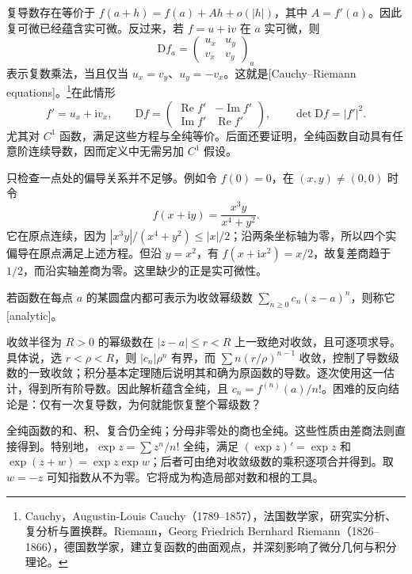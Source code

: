 复导数存在等价于 \(f(a+h)=f(a)+Ah+o(|h|)\)，其中 \(A=f'(a)\)。因此复可微已经蕴含实可微。反过来，若 \(f=u+\mathrm i v\) 在 \(a\) 实可微，则
\[
	\mathrm{D}f_a=
	\begin{pmatrix}u_x&u_y\\v_x&v_y\end{pmatrix}_a
\]
表示复数乘法，当且仅当 \(u_x=v_y\)、\(u_y=-v_x\)。这就是[Cauchy--Riemann equations]。\footnote{Cauchy，Augustin-Louis Cauchy（1789--1857），法国数学家，研究实分析、复分析与置换群。Riemann，Georg Friedrich Bernhard Riemann（1826--1866），德国数学家，建立复函数的曲面观点，并深刻影响了微分几何与积分理论。}在此情形
\begin{equation}
	\label{g4:eq:0101:complex-linear}
	f'=u_x+\mathrm i v_x,\qquad
	\mathrm{D}f=
	\begin{pmatrix}\operatorname{Re}f'&-\operatorname{Im}f'\\
	\operatorname{Im}f'&\operatorname{Re}f'\end{pmatrix},\qquad
	\det\mathrm{D}f=|f'|^2.
\end{equation}
尤其对 \(C^1\) 函数，满足这些方程与全纯等价。后面还要证明，全纯函数自动具有任意阶连续导数，因而定义中无需另加 \(C^1\) 假设。

\ProseParagraphBreak

只检查一点处的偏导关系并不足够。例如令 \(f(0)=0\)，在 \((x,y)\ne(0,0)\) 时令
\[
	f(x+\mathrm i y)=\frac{x^3y}{x^4+y^2}.
\]
它在原点连续，因为 \(|x^3y|/(x^4+y^2)\le |x|/2\)；沿两条坐标轴为零，所以四个实偏导在原点满足上述方程。但沿 \(y=x^2\)，有 \(f(x+\mathrm i x^2)=x/2\)，故复差商趋于 \(1/2\)，而沿实轴差商为零。这里缺少的正是实可微性。

\begin{definition}
	\label{g4:def:0101:analytic}
	若函数在每点 \(a\) 的某圆盘内都可表示为收敛幂级数 \(\sum_{n\ge0}c_n(z-a)^n\)，则称它[analytic]。
\end{definition}

收敛半径为 \(R>0\) 的幂级数在 \(|z-a|\le r<R\) 上一致绝对收敛，且可逐项求导。具体说，选 \(r<\rho<R\)，则 \(|c_n|\rho^n\) 有界，而 \(\sum n(r/\rho)^{n-1}\) 收敛，控制了导数级数的一致收敛；积分基本定理随后说明其和确为原函数的导数。逐次使用这一估计，得到所有阶导数。因此解析蕴含全纯，且 \(c_n=f^{(n)}(a)/n!\)。困难的反向结论是：仅有一次复导数，为何就能恢复整个幂级数？

\ProseParagraphBreak

全纯函数的和、积、复合仍全纯；分母非零处的商也全纯。这些性质由差商法则直接得到。特别地，\(\exp z=\sum z^n/n!\) 全纯，满足 \((\exp z)'=\exp z\) 和 \(\exp(z+w)=\exp z\exp w\)；后者可由绝对收敛级数的乘积逐项合并得到。取 \(w=-z\) 可知指数从不为零。它将成为构造局部对数和根的工具。

